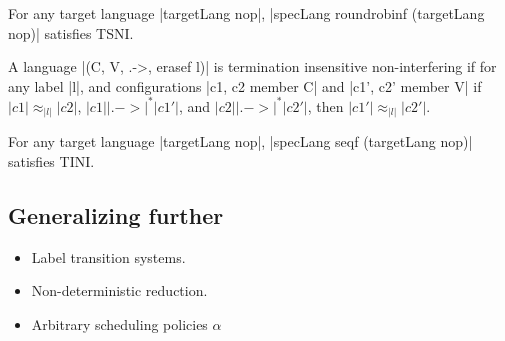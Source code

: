 \begin{theorem}
For any target language |targetLang nop|, |specLang roundrobinf
(targetLang nop)| satisfies TSNI.
\end{theorem}

\begin{definition}
  A language |(C, V, .->, erasef l)| is termination
  insensitive non-interfering if for any label |l|, and configurations
  |c1, c2 member C| and |c1', c2' member V| if
   $|c1| \approx_{|l|} |c2|$,
   $|c1| |.->|^* |c1'|$, and
   $|c2| |.->|^* |c2'|$, then
   $|c1'| \approx_{|l|} |c2'|$.
\end{definition}


\begin{theorem}
For any target language |targetLang nop|, |specLang seqf (targetLang
nop)| satisfies TINI.
\end{theorem}





\subsection{Generalizing further}

\begin{itemize}
\item Label transition systems.
\item Non-deterministic reduction.
\item Arbitrary scheduling policies $\alpha$
\end{itemize}












